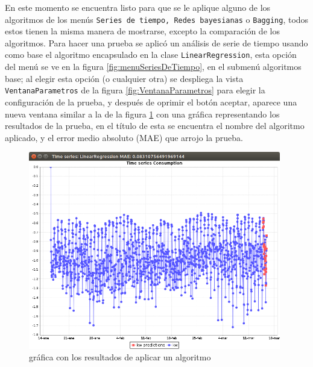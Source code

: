 En este momento se encuentra listo para que se le aplique alguno de los algoritmos de los menús \texttt{Series de tiempo, Redes bayesianas} o \texttt{Bagging}, todos estos tienen la misma manera de mostrarse, excepto la comparación de los algoritmos. Para hacer una prueba se aplicó un análisis de serie de tiempo usando como base el algoritmo encapsulado en la clase \texttt{LinearRegression}, esta opción  del menú se ve en la figura \ref{fig:menuSeriesDeTiempo}, en el submenú algoritmos base; al elegir esta opción (o cualquier otra) se despliega la vista \texttt{VentanaParametros} de la figura \ref{fig:VentanaParametros} para elegir la configuración de la prueba, y después de oprimir el botón aceptar, aparece una nueva ventana similar a la de la figura \ref{fig:resultadoAplicarAlgoritmo} con una gráfica representando los resultados de la prueba, en el título de esta se encuentra el nombre del algoritmo aplicado, y el error medio absoluto (MAE) que arrojo la prueba.

\begin{figure}[h]
	\centering
	\includegraphics[width=11cm]{img/resultadoAplicarAlgoritmo.png}
	\caption{gráfica con los resultados de aplicar un algoritmo}
	\label{fig:resultadoAplicarAlgoritmo}
\end{figure}

